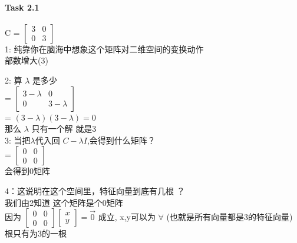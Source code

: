 \documentclass[12pt]{article}
\begin{document}
\paragraph{Task 2.1}
\begin{flushleft}
    C = $\begin{bmatrix}
            3 & 0 \\
            0 & 3
        \end{bmatrix}$ \\
    1: 纯靠你在脑海中想象这个矩阵对二维空间的变换动作 \\
    部数增大(3)

    2: 算 $\lambda $ 是多少\\
    = $\begin{bmatrix}
            3 - \lambda & 0          \\
            0           & 3- \lambda
        \end{bmatrix}$ \\
    = $(3 - \lambda)(3- \lambda) = 0$ \\
    那么 $\lambda$ 只有一个解 就是3 \\

    3: 当把$\lambda $代入回 $C -\lambda I$,会得到什么矩阵？\\
    = $\begin{bmatrix}
            0 & 0 \\
            0 & 0
        \end{bmatrix}$ \\
    会得到0矩阵

    4：这说明在这个空间里，特征向量到底有几根 ？\\
    我们由2知道 这个矩阵是个0矩阵 \\
    因为 $\begin{bmatrix}
            0 & 0 \\
            0 & 0
        \end{bmatrix}\begin{bmatrix}
            x \\
            y
        \end{bmatrix} = \vec{0}$ 成立, x,y可以为 $\forall$ (也就是所有向量都是3的特征向量)\\
    根只有为3的一根
\end{flushleft}
\end{document}
